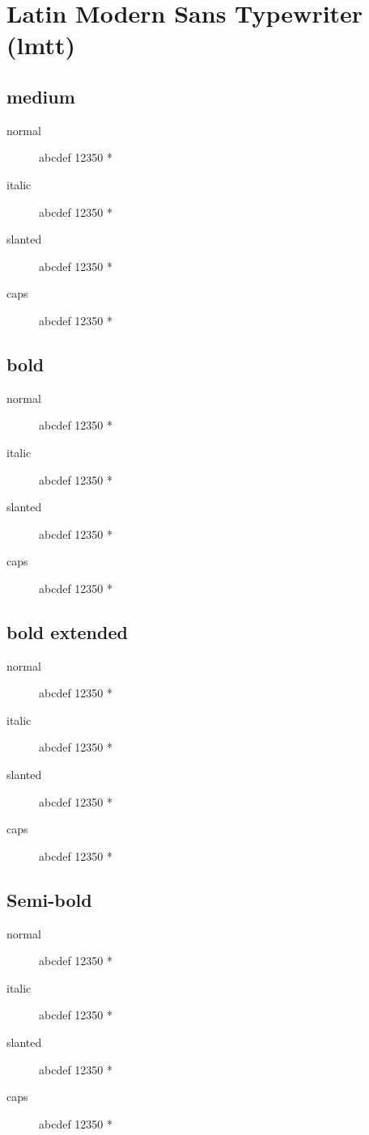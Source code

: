 \section{Latin Modern Sans Typewriter (lmtt)}

\subsection{medium}
\begin{description}
    \item [normal]  abcdef 12350 *
    \item [italic]  abcdef 12350 *
    \item [slanted]  abcdef 12350 *
    \item [caps]  abcdef 12350 *
\end{description}
    
\subsection{bold}
\begin{description}
    \item [normal]  abcdef 12350 *
    \item [italic]  abcdef 12350 *
    \item [slanted]  abcdef 12350 *
    \item [caps]  abcdef 12350 *
\end{description}
    
\subsection{bold extended}
\begin{description}
    \item [normal]  abcdef 12350 *
    \item [italic]  abcdef 12350 *
    \item [slanted]  abcdef 12350 *
    \item [caps]  abcdef 12350 *
\end{description}

\subsection{Semi-bold}
\begin{description}
    \item [normal]  abcdef 12350 *
    \item [italic]  abcdef 12350 *
    \item [slanted]  abcdef 12350 *
    \item [caps]  abcdef 12350 *
\end{description}

